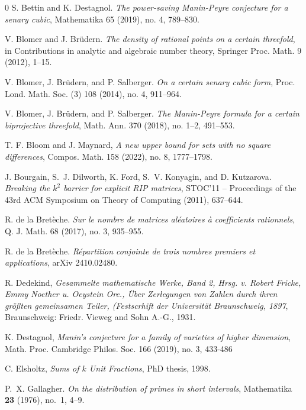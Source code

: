 \documentclass[11pt,letterpaper]{amsart}
\theoremstyle{definition}
\begin{document}
\begin{thebibliography}{0}
S. Bettin and K. Destagnol. \textit{The power-saving {M}anin-{P}eyre conjecture for a senary cubic}, Mathematika 65 (2019), no. 4, 789--830.

V. Blomer and J. Br\"{u}dern. \textit{The density of rational points on a certain threefold}, in Contributions in analytic and algebraic number theory, Springer Proc. Math. 9 (2012), 1--15. 

V. Blomer, J. Br\"{u}dern, and P. Salberger. \textit{On a certain senary cubic form}, Proc. Lond. Math. Soc. (3) 108 (2014), no. 4, 911--964.

V. Blomer, J. Br\"{u}dern, and P. Salberger. \textit{The {M}anin-{P}eyre formula for a certain biprojective threefold}, Math. Ann. 370 (2018), no. 1--2, 491--553.

T. F. Bloom and J. Maynard, \textit{A new upper bound for sets with no square differences}, Compos. Math. 158 (2022), no. 8, 1777--1798.

J. Bourgain, S.~J. Dilworth, K. Ford, S.~V. Konyagin, and D. Kutzarova.
\textit{Breaking the $k^2$ barrier for explicit RIP matrices},
STOC'11 -- Proceedings of the 43rd ACM Symposium on Theory of Computing (2011), 637--644.

R. de la Bret\`eche. \textit{Sur le nombre de matrices al\'{e}atoires \`a coefficients rationnels}, Q. J. Math. 68 (2017), no. 3, 935--955.

R. de la Bret\`eche. \textit{R\'epartition conjointe de trois nombres premiers et applications}, arXiv 2410.02480.

R. Dedekind, \textit{Gesammelte mathematische Werke, Band 2, Hrsg. v. Robert Fricke, Emmy Noether u. Oeystein Ore., \"{U}ber Zerlegungen von Zahlen durch ihren gr\"{o}{\ss}ten gemeinsamen Teiler, (Festscrhift der Universit\"{a}t Braunschweig, 1897}, Braunschweig: Friedr. Vieweg and Sohn A.-G., 1931.

K. Destagnol, \textit{Manin's conjecture for a family of varieties of higher dimension}, Math. Proc. Cambridge Philos. Soc. 166 (2019), no. 3, 433-486

C. Elsholtz, \textit{Sums of $k$ Unit Fractions}, PhD thesis, 1998. 

P.~X. Gallagher. \textit{On the distribution of primes in short intervals},
  Mathematika \textbf{23} (1976), no.~1, 4--9. 


\end{thebibliography}
\end{document}
